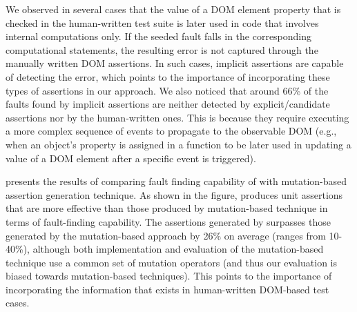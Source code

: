 We observed in several cases that the value of a DOM element property that is checked in the human-written test suite is later used in \javascript code that involves internal computations only. If the seeded fault falls in the corresponding computational statements, the resulting error is not captured through the manually written DOM assertions. In such cases, implicit assertions are capable of detecting the error, which points to the importance of incorporating these types of assertions in our approach. We also noticed that around 66\% of the faults found by implicit assertions are neither detected by explicit/candidate assertions nor by the human-written ones. This is because they require executing a more complex sequence of events to propagate to the observable DOM (e.g., when an object's property is assigned in a function to be later used in updating a value of a DOM element after a specific event is triggered). 

 presents the results of comparing fault finding capability of \atrina with mutation-based assertion generation technique. As shown in the figure, \atrina produces unit assertions that are more effective than those produced by mutation-based technique in terms of fault-finding capability. The assertions generated by \atrina surpasses those generated by the mutation-based approach by 26\% on average (ranges from 10-40\%), although both implementation and evaluation of the mutation-based technique use a common set of mutation operators (and thus our evaluation is biased towards mutation-based techniques).
This points to the importance of incorporating the information that exists in human-written DOM-based test cases.       


